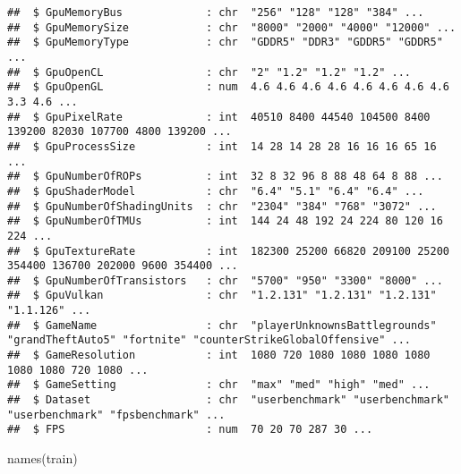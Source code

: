 \documentclass[
]{article}
\newenvironment{Shaded}{\begin{snugshade}}{\end{snugshade}}
\newcommand{\FunctionTok}[1]{\textcolor[rgb]{0.00,0.00,0.00}{#1}}
\newcommand{\NormalTok}[1]{#1}
\begin{document}
\begin{verbatim}
##  $ GpuMemoryBus             : chr  "256" "128" "128" "384" ...
##  $ GpuMemorySize            : chr  "8000" "2000" "4000" "12000" ...
##  $ GpuMemoryType            : chr  "GDDR5" "DDR3" "GDDR5" "GDDR5" ...
##  $ GpuOpenCL                : chr  "2" "1.2" "1.2" "1.2" ...
##  $ GpuOpenGL                : num  4.6 4.6 4.6 4.6 4.6 4.6 4.6 4.6 3.3 4.6 ...
##  $ GpuPixelRate             : int  40510 8400 44540 104500 8400 139200 82030 107700 4800 139200 ...
##  $ GpuProcessSize           : int  14 28 14 28 28 16 16 16 65 16 ...
##  $ GpuNumberOfROPs          : int  32 8 32 96 8 88 48 64 8 88 ...
##  $ GpuShaderModel           : chr  "6.4" "5.1" "6.4" "6.4" ...
##  $ GpuNumberOfShadingUnits  : chr  "2304" "384" "768" "3072" ...
##  $ GpuNumberOfTMUs          : int  144 24 48 192 24 224 80 120 16 224 ...
##  $ GpuTextureRate           : int  182300 25200 66820 209100 25200 354400 136700 202000 9600 354400 ...
##  $ GpuNumberOfTransistors   : chr  "5700" "950" "3300" "8000" ...
##  $ GpuVulkan                : chr  "1.2.131" "1.2.131" "1.2.131" "1.1.126" ...
##  $ GameName                 : chr  "playerUnknownsBattlegrounds" "grandTheftAuto5" "fortnite" "counterStrikeGlobalOffensive" ...
##  $ GameResolution           : int  1080 720 1080 1080 1080 1080 1080 1080 720 1080 ...
##  $ GameSetting              : chr  "max" "med" "high" "med" ...
##  $ Dataset                  : chr  "userbenchmark" "userbenchmark" "userbenchmark" "fpsbenchmark" ...
##  $ FPS                      : num  70 20 70 287 30 ...
\end{verbatim}

\begin{Shaded}
\begin{Highlighting}[]
\FunctionTok{names}\NormalTok{(train)}
\end{Highlighting}
\end{Shaded}
\end{document}
